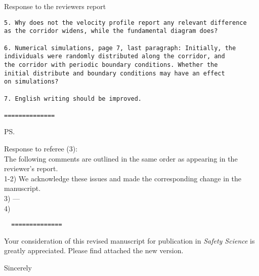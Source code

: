 \documentclass[a4paper,12pt]{letter}
\begin{document}
\begin{letter}{Response to the reviewers report}
\begin{verbatim}
5. Why does not the velocity profile report any relevant difference 
as the corridor widens, while the fundamental diagram does?

6. Numerical simulations, page 7, last paragraph: Initially, the 
individuals were randomly distributed along the corridor, and 
the corridor with periodic boundary conditions. Whether the 
initial distribute and boundary conditions may have an effect 
on simulations?

7. English writing should be improved.

==============

\end{verbatim}


\ps{Response to referee (3): \\

The following comments are outlined in the same order as appearing in the
reviewer’s report. \\

1-2) We acknowledge these issues and made the corresponding change in the 
manuscript.\\

3) ---\\

4) 


\begin{verbatim}
  ==============
\end{verbatim}

}

Your consideration of this revised manuscript for publication in 
\textit{Safety Science} is greatly appreciated. 
Please find attached the new version. \\


\closing{Sincerely}


\end{letter}
\end{document}

